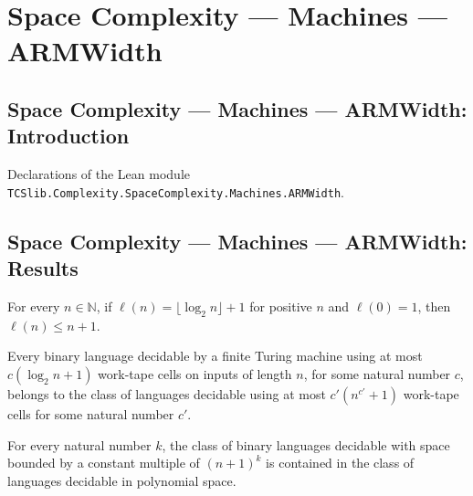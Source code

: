 \section{Space Complexity --- Machines --- ARMWidth}
\subsection*{Space Complexity --- Machines --- ARMWidth: Introduction}

Declarations of the Lean module \texttt{TCSlib.Complexity.SpaceComplexity.Machines.ARMWidth}.

\subsection*{Space Complexity --- Machines --- ARMWidth: Results}

\begin{lemma}
\label{Complexity.logSpace_le_succ}
\leanok
{}
For every $n\in\mathbb{N}$, if $\ell(n)=\lfloor\log_2 n\rfloor+1$ for positive $n$ and
$\ell(0)=1$, then $\ell(n)\le n+1$.
\end{lemma}

\begin{theorem}
\label{Complexity.LOGSPACE_subset_PSPACE}
\leanok
{}
Every binary language decidable by a finite Turing machine using at most $c(\log_2 n+1)$
work-tape cells on inputs of length $n$, for some natural number $c$, belongs to the
class of languages decidable using at most $c'(n^{c'}+1)$ work-tape cells for some
natural number $c'.$
\end{theorem}

\begin{theorem}
\label{Complexity.SPACE_succ_pow_subset_PSPACE}
\leanok
{}
For every natural number $k$, the class of binary languages decidable with space bounded
by a constant multiple of $(n+1)^k$ is contained in the class of languages decidable in
polynomial space.
\end{theorem}

